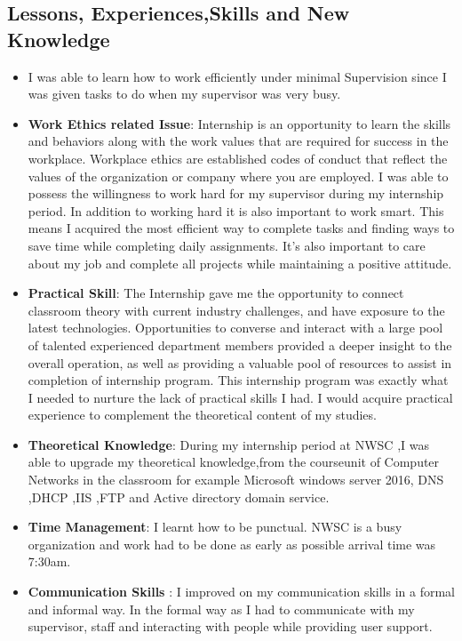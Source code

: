 \documentclass{article}
\begin{document}
\subsection{Lessons, Experiences,Skills and New Knowledge}
\begin{itemize}
\item I was able to learn how to work efficiently under minimal Supervision since I was given tasks to do when my supervisor was very busy.
  \item \textbf{Work Ethics related Issue}: Internship is an opportunity to learn the skills and behaviors along with the work values that are required for success in the workplace. Workplace ethics are established codes of conduct that reflect the values of the organization or company where you are employed. I was able to possess the willingness to work hard for my supervisor during my internship period. In addition to working hard it is also important to work smart. This means I acquired the most efficient way to complete tasks and finding ways to save time while completing daily assignments. It’s also important to care about my job and complete all projects while maintaining a positive attitude.
\item \textbf{Practical Skill}: The Internship gave me  the opportunity to connect classroom theory with current industry challenges, and have exposure to the latest technologies. Opportunities to converse and interact with a large pool of talented experienced department members  provided a deeper insight to the overall operation, as well as providing a valuable pool of resources to assist in completion of internship program. This internship program was exactly what I needed to nurture the lack of practical skills I had. I would acquire practical experience to complement the theoretical content of my studies.
\item \textbf{Theoretical Knowledge}: During my internship period at NWSC ,I was able to  upgrade my theoretical knowledge,from the courseunit  of  Computer Networks in the classroom for example Microsoft windows server 2016, DNS ,DHCP ,IIS ,FTP and Active directory domain service.
  \item \textbf{Time Management}:  I learnt how to be punctual. NWSC is a busy organization and work had to be done as early as possible arrival time was 7:30am.
\item \textbf{Communication Skills} : I improved on my  communication skills in a formal and informal way. In the formal way as I had to communicate with my supervisor, staff and interacting with people while providing user support.

\end{itemize}
\end{document}
